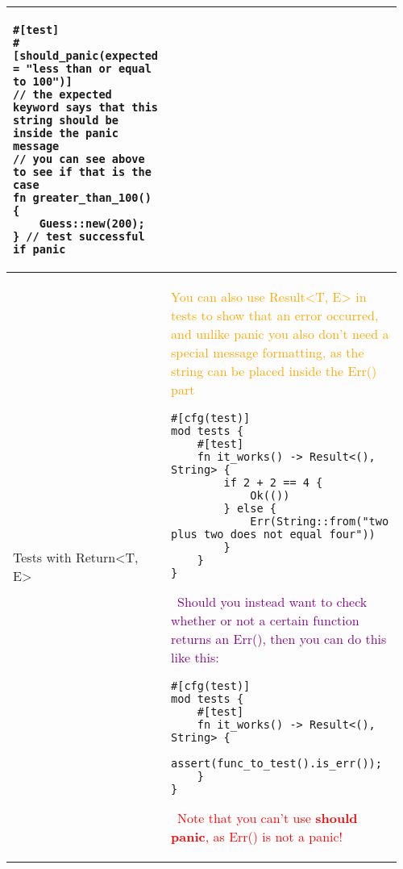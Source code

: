 \documentclass[main.tex,fontsize=8pt,paper=a4,paper=portrait,DIV=calc,]{scrartcl}
\begin{document}
\begin{table}[ht!]
\begin{tabular}{|m{0.2\linewidth}|m{0.755\linewidth}|}
\begin{lstlisting}
#[test]
#[should_panic(expected = "less than or equal to 100")]
// the expected keyword says that this string should be inside the panic message
// you can see above to see if that is the case
fn greater_than_100() {
    Guess::new(200);
} // test successful if panic
\end{lstlisting}\\
\hline
Tests with Return<T, E> & 
\textcolor{orange}{You can also use Result<T, E> in tests to show that an error occurred, and unlike panic you also don't need a special message formatting, as the string can be placed inside the Err() part}\newline
\begin{lstlisting}
#[cfg(test)]
mod tests {
    #[test]
    fn it_works() -> Result<(), String> {
        if 2 + 2 == 4 {
            Ok(())
        } else {
            Err(String::from("two plus two does not equal four"))
        }
    }
}
\end{lstlisting} 
\, \newline
\textcolor{purple}{Should you instead want to check whether or not a certain function returns an Err(), then you can do this like this:}\newline
\begin{lstlisting}
#[cfg(test)]
mod tests {
    #[test]
    fn it_works() -> Result<(), String> {
        assert(func_to_test().is_err());
    }
}
\end{lstlisting}
\, \newline
\textcolor{red}{Note that you can't use \textbf{should panic}, as Err() is not a panic!}\\
\hline
\end{tabular}
\end{table}
\pagebreak
\end{document}
